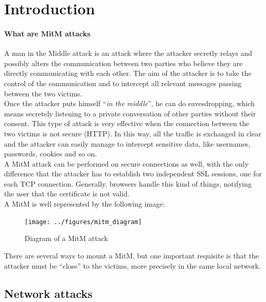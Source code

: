 \documentclass[draft]{article}
\begin{document}
\def\snode#1#2#3{%
  \node[long,right=of #1, label=center:#3] (#2) {}}

\def\dnode#1#2#3{%
  \node[double,right=of #1, label=center:#3] (#2) {}}



\section{Introduction}
\paragraph{What are \ac{MitM} attacks}
A man in the Middle attack is an attack where the attacker secretly relays
and possibly alters the communication between two parties who believe they
are directly communicating with each other. The aim of the attacker is to
take the control of the communication and to intercept all relevant messages
passing between the two victims. \\
Once the attacker puts himself ``\textit{in the middle}'', he can do eavesdropping,
which means secretely listening to a private conversation of other parties without their consent.
This type of attack is very effective when the connection between the two
victims is not secure (HTTP).
In this way, all the traffic is exchanged in clear and the attacker can
easily manage to intercept sensitive data, like usernames, passwords, cookies and so on. \\
A \ac{MitM} attack can be performed on secure connections as well,
with the only difference that the attacker has to establish
two independent SSL sessions, one for each TCP connection.
Generally, browsers handle this kind of things,
notifying the user that the certificate is not valid. \\
A \ac{MitM} is well represented by the following image:

\begin{figure}[h]
\center
\texttt{[image: ../figures/mitm\_diagram]}
\caption{Diagram of a \ac{MitM} attack}
\end{figure}

\noindent There are several ways to mount a \ac{MitM},
but one important requisite is that the attacker must be ``close''
to the victims, more precisely in the same local network.

\subsection{Network attacks}
\end{document}
